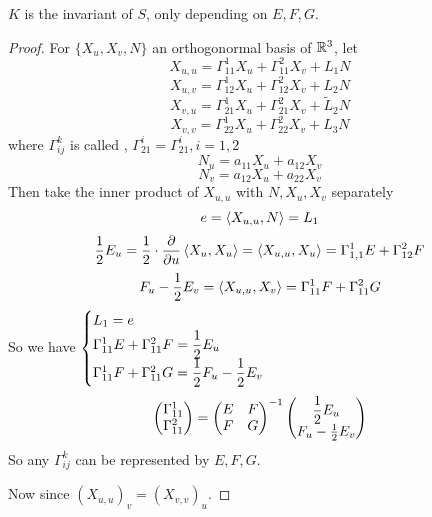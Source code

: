 \begin{theorem}\label{Gauss fantanstic theorem}
     $ K  $ is the invariant of  $ S $, only depending on  $ E,F,G $.  
\end{theorem}
\begin{proof}
    For  $ \{X_u,X_v,N\} $ an orthogonormal basis of  $ \mathbb R^3 $, let 
    \[X_{u,u}=\Gamma^1_{11}X_u+\Gamma_{11}^2X_v+L_1N\]
    \[X_{u,v}=\Gamma_{12}^1X_u+\Gamma_{12}^2X_v+L_2N\]  
    \[X_{v,u}=\Gamma_{21}^1X_u+\Gamma_{21}^2X_v+\tilde{L}_2N\]
    \[X_{v,v}=\Gamma_{22}^1X_u+\Gamma_{22}^2X_v+L_3N\]
    where  $ \Gamma_{ij}^k $ is called ,  $ \Gamma_{21}^i=\Gamma_{21}^i,i=1,2 $ 
    \[N_u=a_{11}X_u+a_{12}X_v\]
    \[N_v=a_{12}X_u+a_{22}X_v\]
    Then take the inner product of  $ X_{u,u} $ with  $ N,X_u,X_v $ separately  
    \[e=\left<X_{u,u},N\right>=L_1\]
    \[\frac{1}{2}E_u=\frac{1}{2}\cdot\frac{\partial }{\partial u}\left<X_u,X_u\right>=\left<X_{u,u},X_u\right>=\Gamma_{1,1}^1E+\Gamma_{12}^2F\]
    \[F_u-\frac{1}{2}E_v=\left<X_{u,u},X_v\right>=\Gamma_{11}^1F+\Gamma_{11}^2G\]
    So we have  $ \begin{cases}
        L_1=e\\
        \Gamma_{11}^1E+\Gamma_{11}^2F=\displaystyle\frac{1}{2}E_u\\
        \Gamma_{11}^1F+\Gamma_{11}^2G=\displaystyle\frac{1}{2}F_u-\frac{1}{2}E_v
    \end{cases} $ \ie 
    \begin{equation}
        \begin{pmatrix}
            \Gamma_{11}^1\\
            \Gamma_{11}^2
        \end{pmatrix}=\begin{pmatrix}
            E&F\\
            F&G
        \end{pmatrix}^{-1}\begin{pmatrix}
            \displaystyle\frac{1}{2}E_u\\
            F_u-\frac{1}{2}E_v
        \end{pmatrix}
    \end{equation}
    So any  $ \Gamma_{ij}^k $ can be represented by  $ E,F,G $.
    
    Now since   $ (X_{u,u})_v=(X_{v,v})_u $.
    

\end{proof}
